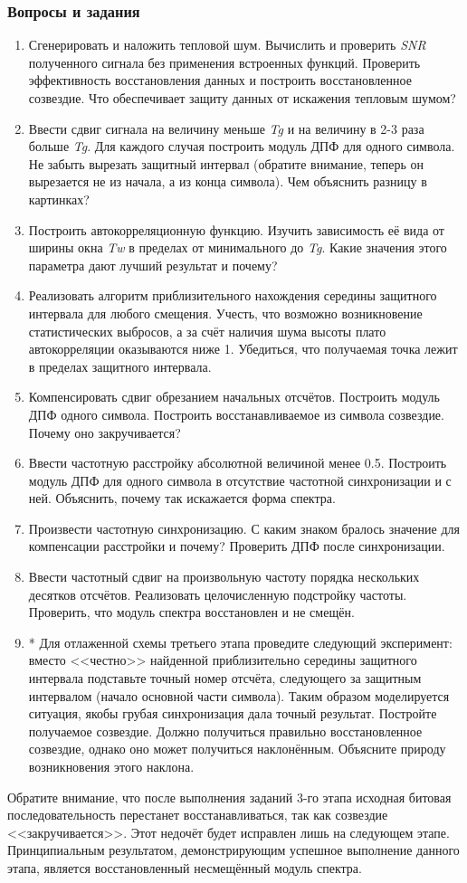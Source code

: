 \subsubsection{Вопросы и задания}
\begin{enumerate}
\item
Сгенерировать и наложить тепловой шум. Вычислить и проверить \textit{SNR} полученного сигнала без применения встроенных функций. Проверить эффективность восстановления данных и построить восстановленное созвездие. Что обеспечивает защиту данных от искажения тепловым шумом?
\item
Ввести сдвиг сигнала на величину меньше \textit{Tg} и на величину в 2-3 раза больше \textit{Tg}. Для каждого случая построить модуль ДПФ для одного символа. Не забыть вырезать защитный интервал (обратите внимание, теперь он вырезается не из начала, а из конца символа). Чем объяснить разницу в картинках?
\item
Построить автокорреляционную функцию. Изучить зависимость её вида от ширины окна \textit{Tw} в пределах от минимального до \textit{Tg}. Какие значения этого параметра дают лучший результат и почему?
\item
Реализовать алгоритм приблизительного нахождения середины защитного интервала для любого смещения. Учесть, что возможно возникновение статистических выбросов, а за счёт наличия шума высоты плато автокорреляции оказываются ниже 1. Убедиться, что получаемая точка лежит в пределах защитного интервала.
\item
Компенсировать сдвиг обрезанием начальных отсчётов. Построить модуль ДПФ одного символа. Построить восстанавливаемое из символа созвездие. Почему оно закручивается?
\item
Ввести частотную расстройку абсолютной величиной менее 0.5. Построить модуль ДПФ для одного символа в отсутствие частотной синхронизации и с ней. Объяснить, почему так искажается форма спектра.
\item
Произвести частотную синхронизацию. С каким знаком бралось значение для компенсации расстройки и почему? Проверить ДПФ после синхронизации.
\item
Ввести частотный сдвиг на произвольную частоту порядка нескольких десятков отсчётов. Реализовать целочисленную подстройку частоты. Проверить, что модуль спектра восстановлен и не смещён. 
\item *
Для отлаженной схемы третьего этапа проведите следующий эксперимент: вместо <<честно>> найденной приблизительно середины защитного интервала подставьте точный номер отсчёта, следующего за защитным интервалом (начало основной части символа). Таким образом моделируется ситуация, якобы грубая синхронизация дала точный результат. Постройте получаемое созвездие. Должно получиться правильно восстановленное созвездие, однако оно может получиться наклонённым. Объясните природу возникновения этого наклона.
\end{enumerate}
Обратите внимание, что после выполнения заданий 3-го этапа исходная битовая последовательность перестанет восстанавливаться, так как созвездие <<закручивается>>. Этот недочёт будет исправлен лишь на следующем этапе. Принципиальным результатом, демонстрирующим успешное выполнение данного этапа, является восстановленный несмещённый модуль спектра.